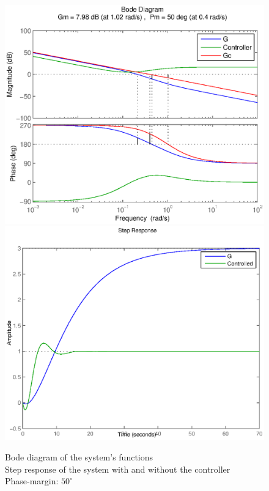 \begin{figure}[h!t]
   \includegraphics[width=\columnwidth]{fig/bode413.eps}
   \includegraphics[width=\columnwidth]{fig/step413.eps}
    \caption{Bode diagram of the system's functions \\ Step response of the system with and without the controller \\ Phase-margin: $50^{\circ}$}
    \label{figstep413}
\end{figure}



